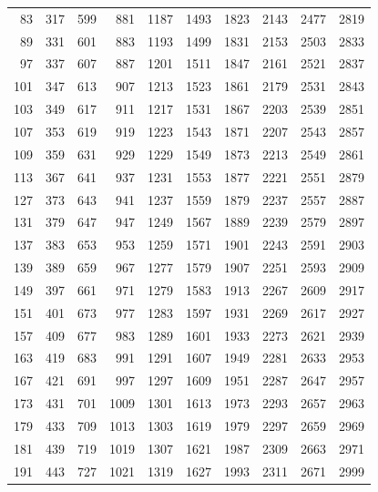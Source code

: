 \begin{center}
\begin{tabular}{*{10}{r}}
83 & 317 & 599 & 881 & 1187 & 1493 & 1823 & 2143 & 2477 & 2819 \\
89 & 331 & 601 & 883 & 1193 & 1499 & 1831 & 2153 & 2503 & 2833 \\
97 & 337 & 607 & 887 & 1201 & 1511 & 1847 & 2161 & 2521 & 2837 \\
101 & 347 & 613 & 907 & 1213 & 1523 & 1861 & 2179 & 2531 & 2843 \\
103 & 349 & 617 & 911 & 1217 & 1531 & 1867 & 2203 & 2539 & 2851 \\
107 & 353 & 619 & 919 & 1223 & 1543 & 1871 & 2207 & 2543 & 2857 \\
109 & 359 & 631 & 929 & 1229 & 1549 & 1873 & 2213 & 2549 & 2861 \\
113 & 367 & 641 & 937 & 1231 & 1553 & 1877 & 2221 & 2551 & 2879 \\
127 & 373 & 643 & 941 & 1237 & 1559 & 1879 & 2237 & 2557 & 2887 \\
131 & 379 & 647 & 947 & 1249 & 1567 & 1889 & 2239 & 2579 & 2897 \\
137 & 383 & 653 & 953 & 1259 & 1571 & 1901 & 2243 & 2591 & 2903 \\
139 & 389 & 659 & 967 & 1277 & 1579 & 1907 & 2251 & 2593 & 2909 \\
149 & 397 & 661 & 971 & 1279 & 1583 & 1913 & 2267 & 2609 & 2917 \\
151 & 401 & 673 & 977 & 1283 & 1597 & 1931 & 2269 & 2617 & 2927 \\
157 & 409 & 677 & 983 & 1289 & 1601 & 1933 & 2273 & 2621 & 2939 \\
163 & 419 & 683 & 991 & 1291 & 1607 & 1949 & 2281 & 2633 & 2953 \\
167 & 421 & 691 & 997 & 1297 & 1609 & 1951 & 2287 & 2647 & 2957 \\
173 & 431 & 701 & 1009 & 1301 & 1613 & 1973 & 2293 & 2657 & 2963 \\
179 & 433 & 709 & 1013 & 1303 & 1619 & 1979 & 2297 & 2659 & 2969 \\
181 & 439 & 719 & 1019 & 1307 & 1621 & 1987 & 2309 & 2663 & 2971 \\
191 & 443 & 727 & 1021 & 1319 & 1627 & 1993 & 2311 & 2671 & 2999 \\
\bottomrule
\end{tabular}
\end{center}
